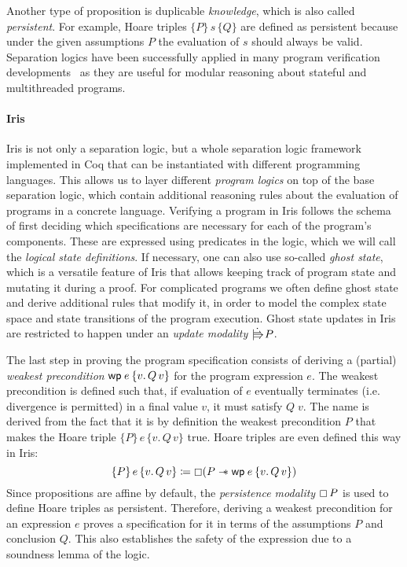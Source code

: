 Another type of proposition is duplicable \emph{knowledge}, which is also called \emph{persistent}.
For example, Hoare triples \(\{P\}\,s\,\{Q\}\) are defined as persistent because under the given assumptions \(P\) the evaluation of \(s\) should always be valid.
Separation logics have been successfully applied in many program verification developments~\cite{?,?,?} as they are useful for modular reasoning about stateful and multithreaded programs.

\paragraph{Iris}
Iris is not only a separation logic, but a whole separation logic framework implemented in Coq that can be instantiated with different programming languages.
This allows us to layer different \emph{program logics} on top of the base separation logic, which contain additional reasoning rules about the evaluation of programs in a concrete language.
Verifying a program in Iris follows the schema of first deciding which specifications are necessary for each of the program's components.
These are expressed using predicates in the logic, which we will call the \emph{logical state definitions}.
If necessary, one can also use so-called \emph{ghost state},
which is a versatile feature of Iris that allows keeping track of program state and mutating it during a proof.
For complicated programs we often define ghost state and derive additional rules that modify it, in order to model the complex state space and state transitions of the program execution.
Ghost state updates in Iris are restricted to happen under an \emph{update modality} \(\upd P\).

The last step in proving the program specification consists of deriving a (partial) \emph{weakest precondition} \(\wpre{e}{v.\, Q\, v}\) for the program expression \(e\).
The weakest precondition is defined such that, if evaluation of \(e\) eventually terminates (i.e. divergence is permitted) in a final value \(v\), it must satisfy \(Q\; v\).
The name is derived from the fact that it is by definition the weakest precondition \(P\) that makes the Hoare triple \(\{P\}\,e\,\{v.\,Q\,v\}\) true.
Hoare triples are even defined this way in Iris:
\[
  \{P\}\,e\,\{v.\,Q\,v\} \coloneq \always (P \wand \wpre{e}{v.\, Q\, v})
\]
Since propositions are affine by default, the \emph{persistence modality} \(\mathop{\boxempty} P\) is used to define Hoare triples as persistent.
Therefore, deriving a weakest precondition for an expression \(e\) proves a specification for it in terms of the assumptions \(P\) and conclusion \(Q\).
This also establishes the safety of the expression due to a soundness lemma of the logic.


